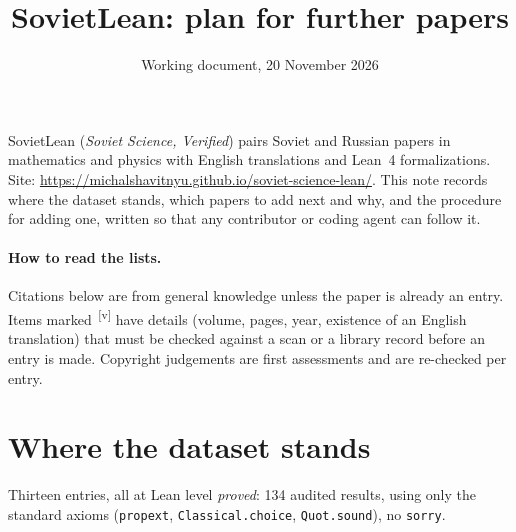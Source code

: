 \documentclass[11pt]{article}
\title{SovietLean: plan for further papers}
\author{Working document, 20 November 2026}
\date{}
\newcommand{\verify}{\textsuperscript{\color{gray}\,[v]}}
\begin{document}
\maketitle

\noindent SovietLean (\emph{Soviet Science, Verified}) pairs Soviet and Russian papers in mathematics and physics with English translations and Lean~4 formalizations. Site: \url{https://michalshavitnyu.github.io/soviet-science-lean/}. This note records where the dataset stands, which papers to add next and why, and the procedure for adding one, written so that any contributor or coding agent can follow it.

\paragraph{How to read the lists.} Citations below are from general knowledge unless the paper is already an entry. Items marked \verify{} have details (volume, pages, year, existence of an English translation) that must be checked against a scan or a library record before an entry is made. Copyright judgements are first assessments and are re-checked per entry.

\section{Where the dataset stands}

Thirteen entries, all at Lean level \emph{proved}: 134 audited results, using only the standard axioms (\texttt{propext}, \texttt{Classical.choice}, \texttt{Quot.sound}), no \texttt{sorry}.
\end{document}
